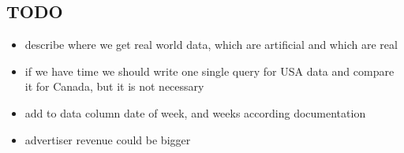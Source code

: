 \subsection{TODO} %
\label{sub:TODO}

\begin{itemize}
    \item describe where we get real world data, which are artificial and which are real
    \item if we have time we should write one single query for USA data and compare it for Canada,
            but it is not necessary
    \item add to data column date of week, and weeks according documentation
    \item advertiser revenue could be bigger
\end{itemize}

